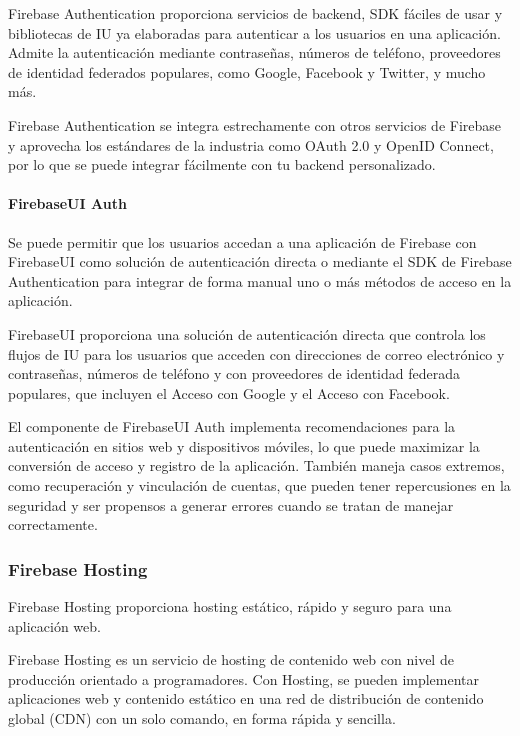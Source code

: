 Firebase Authentication proporciona servicios de backend, SDK fáciles de usar y
bibliotecas de IU ya elaboradas para autenticar a los usuarios en una aplicación.
Admite la autenticación mediante contraseñas, números de teléfono, proveedores
de identidad federados populares, como Google, Facebook y Twitter, y mucho más.

Firebase Authentication se integra estrechamente con otros servicios de Firebase
y aprovecha los estándares de la industria como OAuth 2.0 y OpenID Connect, por
lo que se puede integrar fácilmente con tu backend personalizado.


\paragraph{FirebaseUI Auth}
\label{\detokenize{chapter_one/firebase:firebaseui-auth}}
Se puede permitir que los usuarios accedan a una aplicación de Firebase con FirebaseUI
como solución de autenticación directa o mediante el SDK de Firebase
Authentication para integrar de forma manual uno o más métodos de acceso en la
aplicación.

FirebaseUI proporciona una solución de autenticación directa que controla los
flujos de IU para los usuarios que acceden con direcciones de correo electrónico
y contraseñas, números de teléfono y con proveedores de identidad federada
populares, que incluyen el Acceso con Google y el Acceso con Facebook.

El componente de FirebaseUI Auth implementa recomendaciones para la autenticación
en sitios web y dispositivos móviles, lo que puede maximizar la conversión de
acceso y registro de la aplicación. También maneja casos extremos, como recuperación
y vinculación de cuentas, que pueden tener repercusiones en la seguridad y ser
propensos a generar errores cuando se tratan de manejar correctamente.



\subsubsection{Firebase Hosting}
\label{\detokenize{chapter_one/firebase:firebase-hosting}}
Firebase Hosting proporciona hosting estático, rápido y seguro para una aplicación web.

Firebase Hosting es un servicio de hosting de contenido web con nivel de
producción orientado a programadores. Con Hosting, se pueden implementar aplicaciones web
y contenido estático en una red de distribución de contenido global (CDN) con
un solo comando, en forma rápida y sencilla.

